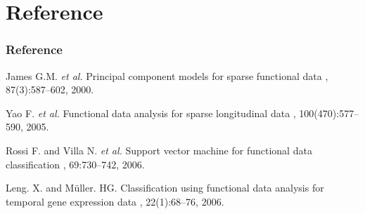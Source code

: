 \documentclass{beamer}
\begin{document}
\appendix
\section{Reference}
\begin{frame}
  \frametitle<presentation>{Reference}
    
  \begin{thebibliography}{10}
  	\beamertemplatearticlebibitems
		James G.M. \textit{et al.}
		\newblock Principal component models for sparse functional data
		, 87(3):587--602,
		2000.
		
   	\beamertemplatearticlebibitems
		Yao F. \textit{et al.}
		\newblock Functional data analysis for sparse longitudinal data
		, 100(470):577--590,
		2005.
	
   	\beamertemplatearticlebibitems
		 Rossi F. and Villa N. \textit{et al.}
		 \newblock Support vector machine for functional data classification
		 , 69:730--742,
		 2006.
    
    \beamertemplatearticlebibitems
    Leng. X. and Müller. HG.
    \newblock Classification using functional data analysis for temporal gene expression data
    , 22(1):68--76,
    2006.

  \end{thebibliography}
\end{frame}


%
%    
%    
%
% 
%    
%
\end{document}
